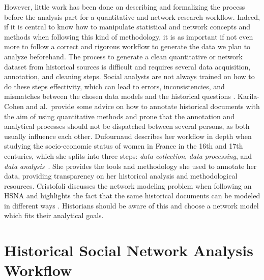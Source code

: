 However, little work has been done on describing and formalizing the process before the analysis part for a quantitative and network research workflow.
Indeed, if it is central to know how to manipulate statistical and network concepts and methods when following this kind of methodology, it is as important if not even more to follow a correct and rigorous workflow to generate the data we plan to analyze beforehand.
The process to generate a clean quantitative or network dataset from historical sources is difficult and requires several data acquisition, annotation, and cleaning steps.
Social analysts are not always trained on how to do these steps effectivity, which can lead to errors, inconsistencies, and mismatches between the chosen data models and the historical questions \cite{alkadi2022}.
Karila-Cohen and al.\ provide some advice on how to annotate historical documents with the aim of using quantitative methods \cite{karila-cohenNouvellesCuisinesHistoire2018} and prone that the annotation and analytical processes should not be dispatched between several persons, as both usually influence each other.
Dufournaud describes her workflow in depth when studying the socio-economic status of women in France in the 16th and 17th centuries, which she splits into three steps: \textit{data collection}, \textit{data processing}, and \textit{data analysis}~\cite{dufournaudCommentRendreVisible2018}.
She provides the tools and methodology she used to annotate her data, providing transparency on her historical analysis and methodological resources.
Cristofoli discusses the network modeling problem when following an HSNA and highlights the fact that the same historical documents can be modeled in different ways \cite{cristofoliAuxSourcesGrands2008}.
Historians should be aware of this and choose a network model which fits their analytical goals.




\section{Historical Social Network Analysis Workflow}

